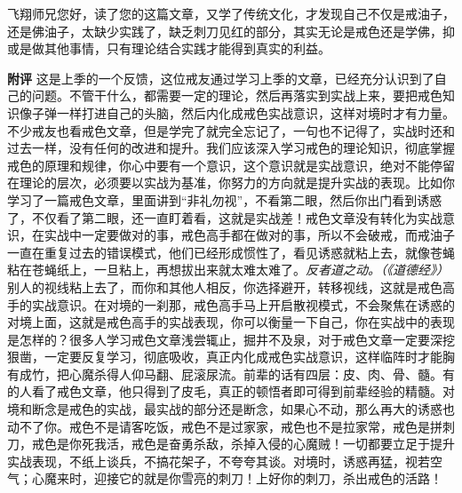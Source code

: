 \begin{case}
    飞翔师兄您好，读了您的这篇文章，又学了传统文化，才发现自己不仅是戒油子，还是佛油子，太缺少实践了，缺乏刺刀见红的部分，其实无论是戒色还是学佛，抑或是做其他事情，只有理论结合实践才能得到真实的利益。

    \textbf{附评} 这是上季的一个反馈，这位戒友通过学习上季的文章，已经充分认识到了自己的问题。不管干什么，都需要一定的理论，然后再落实到实战上来，要把戒色知识像子弹一样打进自己的头脑，然后内化成戒色实战意识，这样对境时才有力量。不少戒友也看戒色文章，但是学完了就完全忘记了，一句也不记得了，实战时还和过去一样，没有任何的改进和提升。我们应该深入学习戒色的理论知识，彻底掌握戒色的原理和规律，你心中要有一个意识，这个意识就是实战意识，绝对不能停留在理论的层次，必须要以实战为基准，你努力的方向就是提升实战的表现。比如你学习了一篇戒色文章，里面讲到“非礼勿视”，不看第二眼，然后你出门看到诱惑了，不仅看了第二眼，还一直盯着看，这就是实战差！戒色文章没有转化为实战意识，在实战中一定要做对的事，戒色高手都在做对的事，所以不会破戒，而戒油子一直在重复过去的错误模式，他们已经形成惯性了，看见诱惑就粘上去，就像苍蝇粘在苍蝇纸上，一旦粘上，再想拔出来就太难太难了。\textit{反者道之动。（《道德经》）} 别人的视线粘上去了，而你和其他人相反，你选择避开，转移视线，这就是戒色高手的实战意识。在对境的一刹那，戒色高手马上开启散视模式，不会聚焦在诱惑的对境上面，这就是戒色高手的实战表现，你可以衡量一下自己，你在实战中的表现是怎样的？很多人学习戒色文章浅尝辄止，掘井不及泉，对于戒色文章一定要深挖狠凿，一定要反复学习，彻底吸收，真正内化成戒色实战意识，这样临阵时才能胸有成竹，把心魔杀得人仰马翻、屁滚尿流。前辈的话有四层：皮、肉、骨、髓。有的人看了戒色文章，他只得到了皮毛，真正的顿悟者即可得到前辈经验的精髓。对境和断念是戒色的实战，最实战的部分还是断念，如果心不动，那么再大的诱惑也动不了你。戒色不是请客吃饭，戒色不是过家家，戒色也不是拉家常，戒色是拼刺刀，戒色是你死我活，戒色是奋勇杀敌，杀掉入侵的心魔贼！一切都要立足于提升实战表现，不纸上谈兵，不搞花架子，不夸夸其谈。对境时，诱惑再猛，视若空气；心魔来时，迎接它的就是你雪亮的刺刀！上好你的刺刀，杀出戒色的活路！
\end{case}

